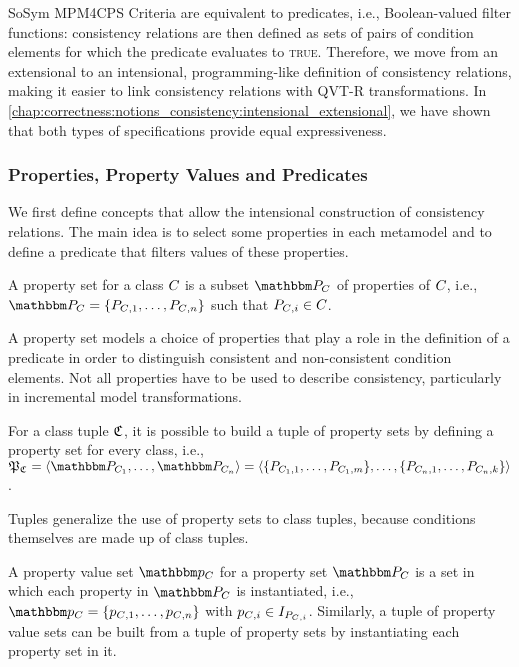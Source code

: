 \begin{copiedFrom}{SoSym MPM4CPS}
Criteria are equivalent to predicates, i.e., Boolean-valued filter functions: consistency relations are then defined as sets of pairs of condition elements for which the predicate evaluates to \textsc{true}. Therefore, we move from an extensional to an intensional, programming-like definition of consistency relations, making it easier to link consistency relations with QVT-R transformations.
In \autoref{chap:correctness:notions_consistency:intensional_extensional}, we have shown that both types of specifications provide equal expressiveness.

\subsubsection{Properties, Property Values and Predicates}

We first define concepts that allow the intensional construction of consistency relations. The main idea is to select some properties in each metamodel and to define a predicate that filters values of these properties.

\begin{definition}
A property set for a class $C_{}$ is a subset $\propertyset{P}{\class{C}{}}$ of properties of $C_{}$, i.e., $\propertyset{P}{\class{C}{}} = \{P_{\class{C}{}, 1}, \dots, P_{\class{C}{}, n}\}$ such that $P_{C_{}, i} \in C_{}$.
\end{definition}

A property set models a choice of properties that play a role in the definition
of a predicate in order to distinguish consistent and non-consistent condition elements. Not all properties have to be used to describe consistency, particularly in incremental model transformations. 

\begin{definition}
For a class tuple $\mathfrak{C}_{}$, it is possible to build a tuple of property sets by defining a property set for every class, i.e., $\propertysettuple{P}{\classtuple{C}{}} = \tupled{\propertyset{P}{\class{C}{1}}, \dots, \propertyset{P}{\class{C}{n}}} = \tupled{\{P_{\class{C}{1}, 1}, \dots, P_{\class{C}{1}, m}\}, \dots, \{P_{\class{C}{n}, 1}, \dots, P_{\class{C}{n}, k}\}}$.
\end{definition}

Tuples generalize the use of property sets to class tuples, because conditions themselves are made up of class tuples.

\begin{definition}
A property value set $\propertyvalueset{p}{\class{C}{}}$ for a property set $\propertyset{P}{\class{C}{}}$ is a set in which each property in $\propertyset{P}{\class{C}{}}$ is instantiated, i.e., $\propertyvalueset{p}{\class{C}{}} = \{p_{\class{C}{}, 1}, \dots, p_{\class{C}{}, n}\}$ with $p_{C_{}, i} \in I_{P_{C_{}, i}}$. Similarly, a tuple of property value sets can be built from a tuple of property sets by instantiating each property set in it.
\end{definition}


\end{copiedFrom}
